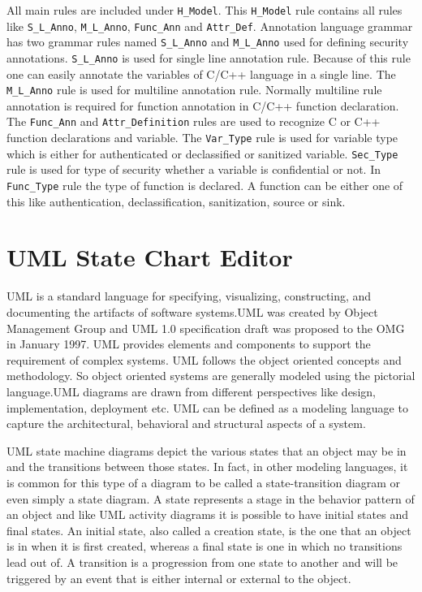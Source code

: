 All main rules are included under \texttt{H\_Model}. This  \texttt{H\_Model} rule contains all rules like \texttt{S\_L\_Anno}, \texttt{M\_L\_Anno}, \texttt{Func\_Ann} and \texttt{Attr\_Def}. Annotation language grammar has two grammar rules named \texttt{S\_L\_Anno} and \texttt{M\_L\_Anno} used for defining security annotations. \texttt{S\_L\_Anno} is used for single line annotation rule. Because of this rule one can easily annotate the variables of C/C++ language in a single line. The \texttt{M\_L\_Anno} rule is used for multiline annotation rule. Normally multiline rule annotation is required for function annotation in C/C++ function declaration. The \texttt{Func\_Ann} and \texttt{Attr\_Definition} rules are used to recognize C or C++ function declarations and variable. The \texttt{Var\_Type} rule is used for variable type which is either for authenticated or declassified or sanitized variable. \texttt{Sec\_Type} rule is used for type of security whether a variable is confidential or not. In \texttt{Func\_Type} rule the type of function is declared. A function can be either one of this like authentication, declassification, sanitization, source or sink.\\


\section{UML State Chart Editor}

UML is a standard language for specifying, visualizing, constructing, and documenting the artifacts of software systems.UML was created by Object Management Group and UML 1.0 specification draft was proposed to the OMG in January 1997. UML provides elements and components to support the requirement of complex systems. UML follows the object oriented concepts and methodology. So object oriented systems are generally modeled using the pictorial language.UML diagrams are drawn from different perspectives like design, implementation, deployment etc. UML can be defined as a modeling language to capture the architectural, behavioral and structural aspects of a system.

UML state machine diagrams depict the various states that an object may be in and the transitions between those states. In fact, in other modeling languages, it is common for this type of a diagram to be called a state-transition diagram or even simply a state diagram. A state represents a stage in the behavior pattern of an object and like UML activity diagrams it is possible to have initial states and final states. An initial state, also called a creation state, is the one that an object is in when it is first created, whereas a final state is one in which no transitions lead out of. A transition is a progression from one state to another and will be triggered by an event that is either internal or external to the object.

